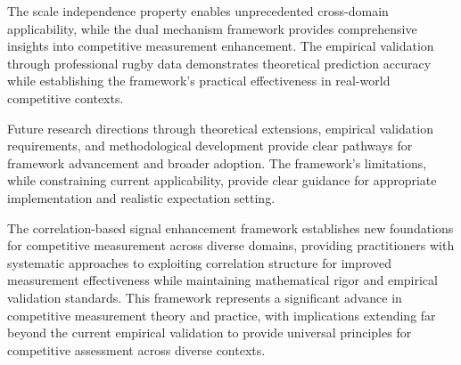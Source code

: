 The scale independence property enables unprecedented cross-domain applicability, while the dual mechanism framework provides comprehensive insights into competitive measurement enhancement. The empirical validation through professional rugby data demonstrates theoretical prediction accuracy while establishing the framework's practical effectiveness in real-world competitive contexts.

Future research directions through theoretical extensions, empirical validation requirements, and methodological development provide clear pathways for framework advancement and broader adoption. The framework's limitations, while constraining current applicability, provide clear guidance for appropriate implementation and realistic expectation setting.

The correlation-based signal enhancement framework establishes new foundations for competitive measurement across diverse domains, providing practitioners with systematic approaches to exploiting correlation structure for improved measurement effectiveness while maintaining mathematical rigor and empirical validation standards. This framework represents a significant advance in competitive measurement theory and practice, with implications extending far beyond the current empirical validation to provide universal principles for competitive assessment across diverse contexts.
